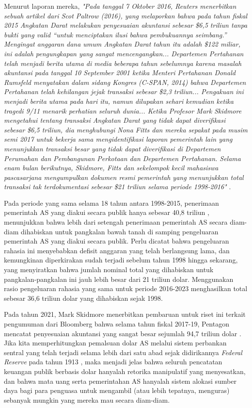 \documentclass[10pt,twocolumn,letterpaper]{article}
\begin{document}
Menurut laporan mereka, \textit{"Pada tanggal 7 Oktober 2016, Reuters menerbitkan sebuah artikel dari Scot Paltrow (2016), yang melaporkan bahwa pada tahun fiskal 2015 Angkatan Darat melakukan penyesuaian akuntansi sebesar \$6,5 triliun tanpa bukti yang valid “untuk menciptakan ilusi bahwa pembukuannya seimbang.” Mengingat anggaran dana umum Angkatan Darat tahun itu adalah \$122 miliar, ini adalah pengungkapan yang sangat mencengangkan... Departemen Pertahanan telah menjadi berita utama di media beberapa tahun sebelumnya karena masalah akuntansi pada tanggal 10 September 2001 ketika Menteri Pertahanan Donald Rumsfeld menyatakan dalam sidang Kongres (C-SPAN, 2014) bahwa Departemen Pertahanan telah kehilangan jejak transaksi sebesar \$2,3 triliun... Pengakuan ini menjadi berita utama pada hari itu, namun dilupakan sehari kemudian ketika tragedi 9/11 menarik perhatian seluruh dunia... Ketika Profesor Mark Skidmore mengetahui tentang transaksi Angkatan Darat yang tidak dapat diverifikasi sebesar \$6,5 triliun, dia menghubungi Nona Fitts dan mereka sepakat pada musim semi 2017 untuk bekerja sama mengidentifikasi laporan pemerintah lain yang menunjukkan transaksi besar yang tidak dapat diverifikasi di Departemen Perumahan dan Pembangunan Perkotaan dan Departemen Pertahanan. Selama enam bulan berikutnya, Skidmore, Fitts dan sekelompok kecil mahasiswa pascasarjana mengumpulkan dokumen resmi pemerintah yang menunjukkan total transaksi tak terdokumentasi sebesar \$21 triliun selama periode 1998-2016"} \cite{12}.

Pada periode yang sama selama 18 tahun antara 1998-2015, penerimaan pemerintah AS yang diakui secara publik hanya sebesar 40,8 triliun \cite{15}, menunjukkan bahwa lebih dari setengah penerimaan pemerintah AS secara diam-diam dihabiskan untuk pangkalan bawah tanah di samping pengeluaran pemerintah AS yang diakui secara publik. Perlu dicatat bahwa pengeluaran rahasia ini menyebabkan defisit anggaran yang telah berlangsung lama, dan kemungkinan diperkirakan sudah terjadi sebelum tahun 1998 hingga sekarang, yang menyiratkan bahwa jumlah nominal total yang dihabiskan untuk pangkalan-pangkalan ini jauh lebih besar dari 21 triliun dolar. Menggunakan rasio pengeluaran rahasia yang sama untuk periode 2016-2023 menghasilkan total sebesar 36,6 triliun dolar yang dihabiskan sejak 1998.

Pada tahun 2021, Mark Skidmore menerbitkan pembaruan untuk riset ini terkait pengumuman dari Bloomberg bahwa selama tahun fiskal 2017-19, Pentagon mencatat penyesuaian akuntansi yang sangat besar sejumlah 94,7 triliun dolar \cite{17,18}. Jika kita memperhitungkan pemalsuan dolar AS melalui sistem perbankan sentral yang telah terjadi selama lebih dari satu abad sejak didirikannya \textit{Federal Reserve} pada tahun 1913 \cite{37}, maka menjadi jelas bahwa seluruh pencatatan keuangan publik berbasis dolar hanyalah retorika manipulatif yang menyesatkan, dan bahwa mata uang serta pemerintahan AS hanyalah sistem alokasi sumber daya bagi para penguasa untuk mengambil (atau lebih tepatnya, menguras) sebanyak mungkin yang mereka mau secara diam-diam.
\end{document}
